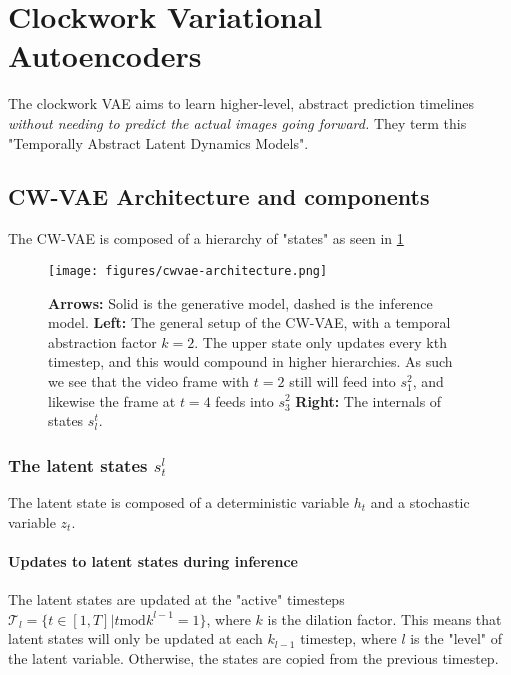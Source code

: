 \section{Clockwork Variational Autoencoders}
The clockwork VAE \cite{saxena_clockwork_2021} aims to learn higher-level, abstract prediction timelines \textit{without needing to predict the actual images going forward.}
They term this "Temporally Abstract Latent Dynamics Models".


\subsection{CW-VAE Architecture and components}
The CW-VAE is composed of a hierarchy of "states" as seen in \cref{fig:cwvae-architecture}

\begin{figure}[hb]
    \begin{small}
        \begin{center}
            \texttt{[image: figures/cwvae-architecture.png]}
        \end{center}
        \caption{
            \textbf{Arrows:} Solid is the generative model, dashed is the inference model. 
            \textbf{Left:} The general setup of the CW-VAE, with a temporal abstraction factor \(k=2\). 
            The upper state only updates every kth timestep, and this would compound in higher hierarchies. 
            As such we see that the video frame with \(t=2\) still will feed into \(s^2_1\), and likewise the frame at \(t=4\) feeds into \(s^2_3\)
            \textbf{Right:} The internals of states \(s_l^t\). 
            }
        \label{fig:cwvae-architecture}
    \end{small}
\end{figure}

\subsubsection{The latent states \(s^l_t\)}

The latent state is composed of a deterministic variable \(h_t\) and a stochastic variable \(z_t\). 


\paragraph{Updates to latent states during inference}
The latent states are updated at the "active" timesteps 
\(\mathcal{T}_l = \{ t \in [1, T] | t \mathrm{mod} k^{l-1} = 1 \}\), 
where \(k\) is the dilation factor.
This means that latent states will only be updated at each \(k_{l-1}\) timestep, where \(l\) is the "level" of the latent variable.
Otherwise, the states are copied from the previous timestep.


